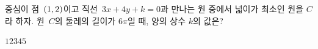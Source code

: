 중심이 점~$(1{,}\mkern3mu 2)$이고 직선~$3x+4y+k=0$과 만나는 원 중에서 넓이가 최소인 원을 $C$라 하자. 원~$C$의 둘레의 길이가 $6\pi$일 때, 양의 상수 $k$의 값은?
\begin{choices32}{$1$}{$2$}{$3$}{$4$}{$5$}\end{choices32}
